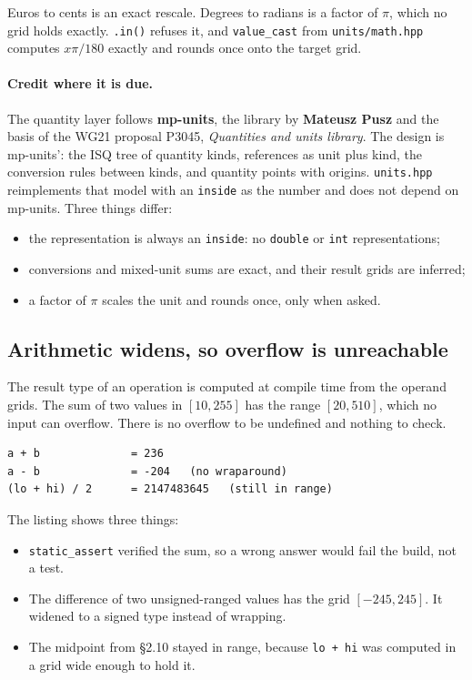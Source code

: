 \documentclass[11pt,a4paper]{article}
\newcommand{\code}[1]{\texttt{\small #1}}
\newcommand{\file}[1]{\texttt{\small #1}}
\begin{document}
\noindent
Euros to cents is an exact rescale. Degrees to radians is a factor of $\pi$,
which no grid holds exactly. \code{.in()} refuses it, and
\code{value\_cast} from \file{units/math.hpp} computes $x\pi/180$ exactly
and rounds once onto the target grid.

\paragraph{Credit where it is due.} The quantity layer follows
\textbf{mp-units}, the library by \textbf{Mateusz Pusz} and the basis of the
WG21 proposal P3045, \emph{Quantities and units library}. The design is
mp-units':
the ISQ tree of quantity kinds, references as unit plus kind, the conversion
rules between kinds, and quantity points with origins. \file{units.hpp}
reimplements that model with an \code{inside} as the number and does not
depend on mp-units. Three things differ:
\begin{itemize}
\item the representation is always an \code{inside}: no \code{double} or
      \code{int} representations;
\item conversions and mixed-unit sums are exact, and their result grids are
      inferred;
\item a factor of $\pi$ scales the unit and rounds once, only when asked.
\end{itemize}

\subsection{Arithmetic widens, so overflow is unreachable}

The result type of an operation is computed at compile time from the operand
grids. The sum of two values in $[10, 255]$ has the range $[20, 510]$, which no
input can overflow. There is no overflow to be undefined and nothing to check.


\begin{lstlisting}[style=term]
a + b              = 236
a - b              = -204   (no wraparound)
(lo + hi) / 2      = 2147483645   (still in range)
\end{lstlisting}

\noindent
The listing shows three things:
\begin{itemize}
\item \code{static\_assert} verified the sum, so a wrong answer would fail the
      build, not a test.
\item The difference of two unsigned-ranged values has the grid
      $[-245, 245]$. It widened to a signed type instead of wrapping.
\item The midpoint from \S2.10 stayed in range, because \code{lo + hi} was
      computed in a grid wide enough to hold it.
\end{itemize}
\end{document}
